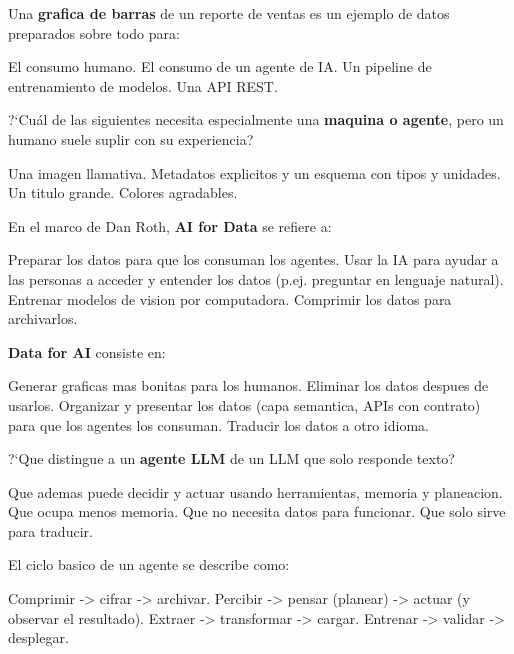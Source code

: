 \documentclass[12pt,addpoints]{exam}
\begin{document}
\begin{questions}

\question[1] Una \textbf{grafica de barras} de un reporte de ventas es un ejemplo
de datos preparados sobre todo para:
\begin{choices}
  \CorrectChoice El consumo humano.
  \choice El consumo de un agente de IA.
  \choice Un pipeline de entrenamiento de modelos.
  \choice Una API REST.
\end{choices}

\question[1] ?`Cu\'al de las siguientes necesita especialmente una \textbf{maquina
o agente}, pero un humano suele suplir con su experiencia?
\begin{choices}
  \choice Una imagen llamativa.
  \CorrectChoice Metadatos explicitos y un esquema con tipos y unidades.
  \choice Un titulo grande.
  \choice Colores agradables.
\end{choices}

\question[1] En el marco de Dan Roth, \textbf{AI for Data} se refiere a:
\begin{choices}
  \choice Preparar los datos para que los consuman los agentes.
  \CorrectChoice Usar la IA para ayudar a las personas a acceder y entender los
    datos (p.ej. preguntar en lenguaje natural).
  \choice Entrenar modelos de vision por computadora.
  \choice Comprimir los datos para archivarlos.
\end{choices}

\question[1] \textbf{Data for AI} consiste en:
\begin{choices}
  \choice Generar graficas mas bonitas para los humanos.
  \choice Eliminar los datos despues de usarlos.
  \CorrectChoice Organizar y presentar los datos (capa semantica, APIs con
    contrato) para que los agentes los consuman.
  \choice Traducir los datos a otro idioma.
\end{choices}

\question[1] ?`Que distingue a un \textbf{agente LLM} de un LLM que solo responde
texto?
\begin{choices}
  \CorrectChoice Que ademas puede decidir y actuar usando herramientas, memoria
    y planeacion.
  \choice Que ocupa menos memoria.
  \choice Que no necesita datos para funcionar.
  \choice Que solo sirve para traducir.
\end{choices}

\question[1] El ciclo basico de un agente se describe como:
\begin{choices}
  \choice Comprimir -> cifrar -> archivar.
  \CorrectChoice Percibir -> pensar (planear) -> actuar (y observar el resultado).
  \choice Extraer -> transformar -> cargar.
  \choice Entrenar -> validar -> desplegar.
\end{choices}


\end{questions}
\end{document}
